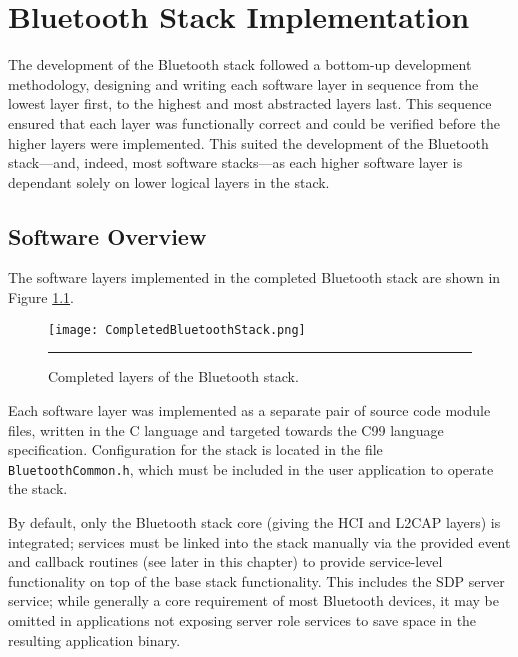 \chapter{Bluetooth Stack Implementation}
\label{chp:btstackimp}

The development of the Bluetooth stack followed a bottom-up development methodology, designing and writing each software layer in sequence from the lowest layer first, to the highest and most abstracted layers last. This sequence ensured that each layer was functionally correct and could be verified before the higher layers were implemented. This suited the development of the Bluetooth stack---and, indeed, most software stacks---as each higher software layer is dependant solely on lower logical layers in the stack.

\section{Software Overview}

The software layers implemented in the completed Bluetooth stack are shown in Figure \ref{fig:completedbtstacklayers}.

\begin{figure}[tbph]
	\vspace{1em}
	\centering
		\texttt{[image: CompletedBluetoothStack.png]}
	\rule{35em}{0.5pt}
	\caption[Completed Bluetooth stack layers]{Completed layers of the Bluetooth stack.}
	\label{fig:completedbtstacklayers}
\end{figure}

Each software layer was implemented as a separate pair of source code module files, written in the C language and targeted towards the C99 language specification. Configuration for the stack is located in the file \texttt{BluetoothCommon.h}, which must be included in the user application to operate the stack.

By default, only the Bluetooth stack core (giving the HCI and L2CAP layers) is integrated; services must be linked into the stack manually via the provided event and callback routines (see later in this chapter) to provide service-level functionality on top of the base stack functionality. This includes the SDP server service; while generally a core requirement of most Bluetooth devices, it may be omitted in applications not exposing server role services to save space in the resulting application binary.

